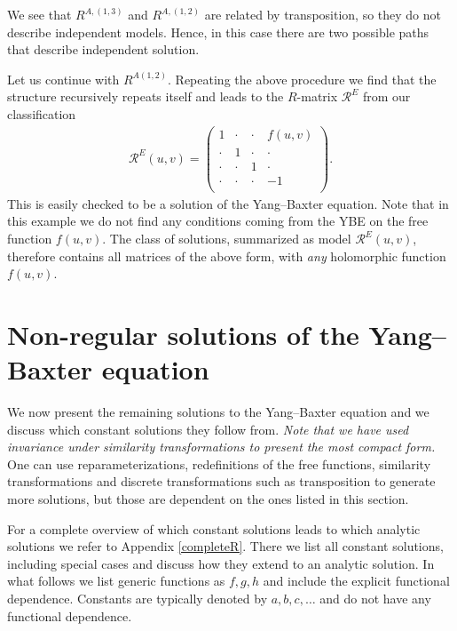 \documentclass{article}
\begin{document}
%
We see that $R^{A,(1,3)}$ and $R^{A,(1,2)}$ are related by transposition, so they do not describe independent models. Hence, in this case there are two possible paths that describe independent solution.

Let us continue with $ R^{A(1,2)}$. Repeating the above procedure we find that the structure recursively repeats itself and leads to the $R$-matrix $ \mathcal{R}^E$ from our classification 
%
\begin{align}
      \mathcal{R}^E(u,v)= \begin{pmatrix}
       1& \cdot & \cdot & f(u,v)\\
        \cdot &1& \cdot &  \cdot \\
        \cdot &\cdot& 1& \cdot  \\
       \cdot& \cdot & \cdot &  -1\\
    \end{pmatrix}.
\end{align}
This is easily checked to be a solution of the Yang--Baxter equation. Note that in this example we do not find any conditions coming from the YBE on the free function $f(u,v)$. The class of solutions, summarized as model $ \mathcal{R}^E(u,v)$, therefore contains all matrices of the above form, with \textit{any} holomorphic function $f(u,v)$.

\section{Non-regular solutions of the Yang--Baxter equation}
\label{Non-constant Models}

We now present the remaining solutions to the Yang--Baxter equation and we discuss which constant solutions they follow from. \textit{Note that we have used invariance under similarity transformations to present the most compact form.} One can use reparameterizations, redefinitions of the free functions,  similarity transformations and discrete transformations such as transposition to generate more solutions, but those are dependent on the ones listed in this section.

For a complete overview of which constant solutions leads to which analytic solutions we refer to Appendix \ref{completeR}. There we list all constant solutions, including special cases and discuss how they extend to an analytic solution. In what follows we list generic functions as $f,g,h$ and include the explicit functional dependence. Constants are typically denoted by $a,b,c,\ldots$ and do not have any functional dependence.
\end{document}
